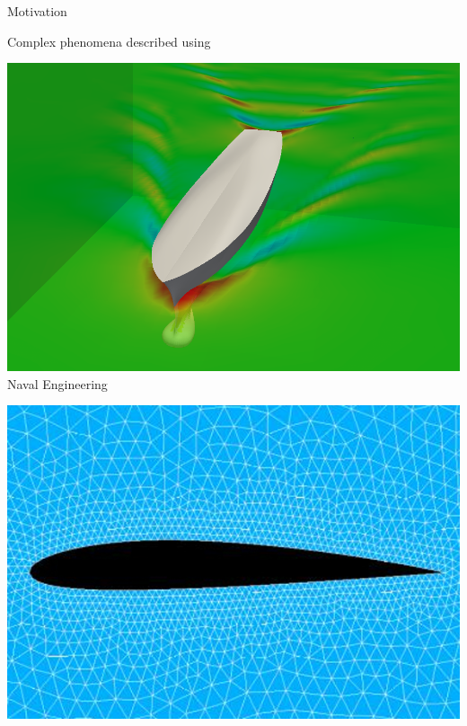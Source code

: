 \begin{frame}{Motivation}
	\Large{}
	\normalsize
	
	Complex phenomena described using  
	\begin{minipage}{\textwidth}
		\vspace{0.5cm}
		\centering
		\begin{minipage}{0.25\textwidth}
			\includegraphics[width=\textwidth]{img/DTMB_orig.png}
			\centering
			Naval Engineering
		\end{minipage}\hspace{0.5cm}
		\begin{minipage}{0.25\textwidth}\hspace{1cm}
			\includegraphics[width=\textwidth]{img/wing.jpg}
			\centering

\end{minipage}
\end{minipage}
\end{frame}
